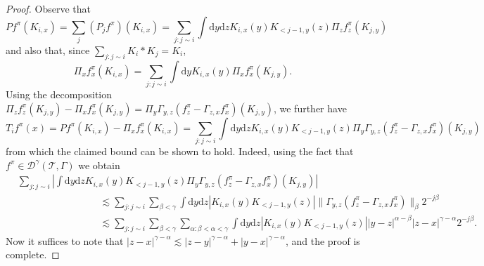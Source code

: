 \documentclass[11pt,a4paper]{article}
\newcommand{\mathd}{\mathrm{d}}
\theoremstyle{remark}
\begin{document}
\begin{proof}
  Observe that
  \[ 
     P f^{\pi} ( K_{i,x} ) = \sum_{j} ( P_{j} f^{\pi} ) ( K_{i,x} ) = \sum_{j: j \sim i} \int \mathd y \mathd zK_{i,x} ( y ) K_{< j-1,y} ( z ) \Pi_{z} f^{\pi}_{z} ( K_{j,y} )
  \]
  and also that, since $\sum_{j:j \sim i} K_{i} \ast K_{j} =K_{i}$,
  \[
     \Pi_{x} f^{\pi}_{x} ( K_{i,x} ) = \sum_{j: j \sim i} \int \mathd y K_{i,x} ( y ) \Pi_{x} f^{\pi}_{x} ( K_{j,y} ).
  \]
  Using the decomposition $\Pi_{z} f^{\pi}_{z} ( K_{j,y} ) - \Pi_{x}
  f^{\pi}_{x} ( K_{j,y} ) = \Pi_{y} \Gamma_{y,z} ( f^{\pi}_{z} - \Gamma_{z,x} f^{\pi}_{x} )
  ( K_{j,y} )$, we further have
  \[
     T_{i} f^{\pi} ( x ) =P f^{\pi} ( K_{i,x} ) - \Pi_{x} f^{\pi}_{x} (K_{i,x} ) = \sum_{j:j \sim i} \int \mathd y \mathd zK_{i,x} ( y ) K_{< j-1,y} ( z ) \Pi_{y} \Gamma_{y,z} ( f^{\pi}_{z} - \Gamma_{z,x} f^{\pi}_{x} ) ( K_{j,y} )
  \]
  from which the claimed bound can be shown to hold. Indeed, using the fact that $f^{\pi} \in \mathcal{D}^{\gamma}( \mathcal{T}, \Gamma )$ we obtain
  \begin{align*}
     &\sum_{j:j \sim i} \left\lvert \int \mathd y \mathd z K_{i,x} ( y ) K_{< j-1,y} ( z ) \Pi_{y} \Gamma_{y,z} ( f^{\pi}_{z} - \Gamma_{z,x}f^{\pi}_{x} ) ( K_{j,y} ) \right\rvert \\
     &\hspace{100pt} \lesssim \sum_{j:j \sim i} \sum_{\beta<\gamma} \int \mathd y \mathd z \left\lvert K_{i,x} ( y ) K_{< j-1,y} ( z ) \right\rvert \|\Gamma_{y,z} ( f^{\pi}_{z} - \Gamma_{z,x}f^{\pi}_{x} )\|_\beta 2^{-j\beta} \\
     &\hspace{100pt} \lesssim \sum_{j:j \sim i} \sum_{\beta<\gamma} \sum_{\alpha: \beta<\alpha<\gamma} \int \mathd y \mathd z \left\lvert K_{i,x} ( y ) K_{< j-1,y} ( z ) \right\rvert |y-z|^{\alpha-\beta} |z-x|^{\gamma-\alpha} 2^{-j\beta}.
  \end{align*}
  Now it suffices to note that $|z-x|^{\gamma-\alpha} \lesssim |z-y|^{\gamma-\alpha} + |y-x|^{\gamma-\alpha}$, and the proof is complete.
\end{proof}
\end{document}
